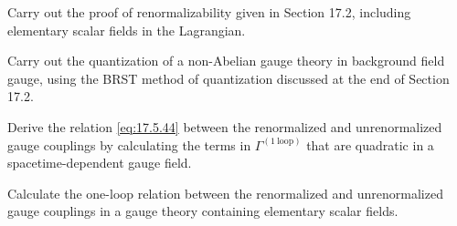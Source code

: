 
\begin{enumerate}
   Carry out the proof of renormalizability given in Section 17.2, including elementary scalar fields in the Lagrangian.

   Carry out the quantization of a non-Abelian gauge theory in background field gauge, using the BRST method of quantization discussed at the end of Section 17.2.

   Derive the relation \eqref{eq:17.5.44} between the renormalized and unrenormalized gauge couplings by calculating the terms in $\Gamma^{(1\ \mathrm{loop})}$ that are quadratic in a spacetime-dependent gauge field.

   Calculate the one-loop relation between the renormalized and unrenormalized gauge couplings in a gauge theory containing elementary scalar fields.
\end{enumerate}
